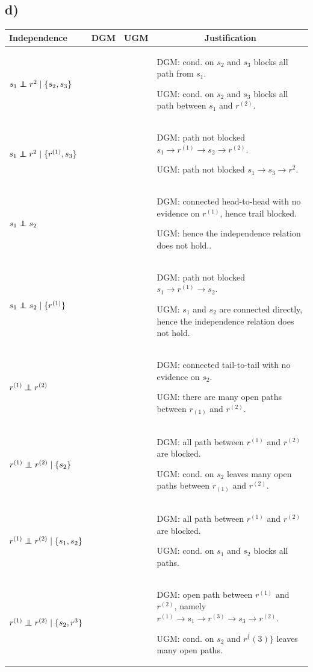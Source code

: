 \documentclass[11pt,a4paper]{article}
\newcommand\independent{\protect\mathpalette{\protect\independenT}{\perp}}
\def\independenT#1#2{\mathrel{\rlap{$#1#2$}\mkern2mu{#1#2}}}
\newcommand{\cmark}{\ding{51}}%
\newcommand{\xmark}{\ding{55}}%
\begin{document}
\subsection*{d)}
\begin{table}[h]
\begin{tabular}{p{3.5cm}ccp{10cm}}
\hline
\multicolumn{1}{|p{3.5cm}|}{\textbf{Independence}} & \multicolumn{1}{c|}{\textbf{DGM}} & \multicolumn{1}{c|}{\textbf{UGM}} & \multicolumn{1}{c|}{\textbf{Justification}} \\ \hline
$s_1 \independent r^{2} \; | \; \{s_2, s_3\}$ & \cmark & \cmark & DGM: cond. on $s_2$ and $s_3$ blocks all path from $s_1$.
\smallskip

UGM: cond. on $s_2$ and $s_3$ blocks all path between $s_1$ and $r^{(2)}$. \\
$s_1 \independent r^{2} \; | \; \{ r^{(1)}, s_3 \} $ & \xmark & \xmark & DGM: path not blocked $s_1 \rightarrow r^{(1)} \rightarrow s_2 \rightarrow r^{(2)} $.
\smallskip

UGM: path not blocked $s_1 \rightarrow s_3 \rightarrow r^{2}$. 
\\
$ s_1 \independent s_2 $ & \cmark & \xmark & DGM: connected head-to-head with no evidence on $r^{(1)}$, hence trail blocked.
\smallskip

UGM: hence the independence relation does not hold..\\
$ s_1 \independent s_2 \; | \; \{ r^{(1)} \}$&\xmark &\xmark & DGM: path not blocked $s_1 \rightarrow r^{(1)} \rightarrow s_2$.
\smallskip

UGM: $s_1$ and $s_2$ are connected directly, hence the independence relation does not hold.\\
$r^{(1)} \independent r^{(2)}$& \xmark & \xmark & DGM: connected tail-to-tail with no evidence on $s_2$.
\smallskip

UGM: there are many open paths between $r_{(1)}$ and $r^{(2)}$.
\\
$r^{(1)} \independent r^{(2)} \; | \; \{ s_2 \}$& \cmark & \xmark & DGM: all path between $r^{(1)}$ and $r^{(2)}$ are blocked.
\smallskip

UGM: cond. on $s_2$ leaves many open paths between $r_{(1)}$ and $r^{(2)}$.
\\
$r^{(1)} \independent r^{(2)} \; | \; \{ s_1, s_2 \}$ & \cmark & \cmark & DGM: all path between $r^{(1)}$ and $r^{(2)}$ are blocked.
\smallskip

UGM: cond. on $s_1$ and $s_2$ blocks all paths.
\\
$r^{(1)} \independent r^{(2)} \; | \; \{ s_2, r^{3} \}$&\xmark & \xmark& DGM: open path between $r^{(1)}$ and $r^{(2)}$, namely $r^{(1)} \rightarrow s_1 \rightarrow r^{(3)} \rightarrow s_3 \rightarrow r^{(2)}$.
\smallskip

UGM: cond. on $s_2$ and $r^\{(3)\}$ leaves many open paths. \\
\end{tabular}
\end{table}
\end{document}
